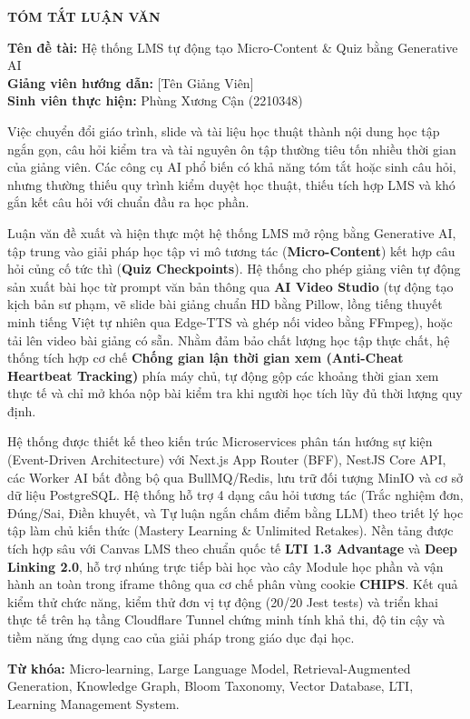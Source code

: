 \thispagestyle{fancy}
\begin{center}
    \textbf{\Large TÓM TẮT LUẬN VĂN}
\end{center}

\vspace{0.5cm}

\noindent\textbf{Tên đề tài:} Hệ thống LMS tự động tạo Micro-Content \& Quiz
bằng Generative AI\\[4pt]
\noindent\textbf{Giảng viên hướng dẫn:} [Tên Giảng Viên]\\[4pt]
\noindent\textbf{Sinh viên thực hiện:} Phùng Xương Cận (2210348)

\vspace{0.7cm}

Việc chuyển đổi giáo trình, slide và tài liệu học thuật thành nội dung học tập
ngắn gọn, câu hỏi kiểm tra và tài nguyên ôn tập thường tiêu tốn nhiều thời
gian của giảng viên. Các công cụ AI phổ biến có khả năng tóm tắt hoặc sinh câu
hỏi, nhưng thường thiếu quy trình kiểm duyệt học thuật, thiếu tích hợp LMS và
khó gắn kết câu hỏi với chuẩn đầu ra học phần.

Luận văn đề xuất và hiện thực một hệ thống LMS mở rộng bằng Generative AI,
tập trung vào giải pháp học tập vi mô tương tác (\textbf{Micro-Content}) kết
hợp câu hỏi củng cố tức thì (\textbf{Quiz Checkpoints}). Hệ thống cho phép
giảng viên tự động sản xuất bài học từ prompt văn bản thông qua \textbf{AI
Video Studio} (tự động tạo kịch bản sư phạm, vẽ slide bài giảng chuẩn HD bằng
Pillow, lồng tiếng thuyết minh tiếng Việt tự nhiên qua Edge-TTS và ghép nối
video bằng FFmpeg), hoặc tải lên video bài giảng có sẵn. Nhằm đảm bảo chất lượng
học tập thực chất, hệ thống tích hợp cơ chế \textbf{Chống gian lận thời gian xem
(Anti-Cheat Heartbeat Tracking)} phía máy chủ, tự động gộp các khoảng thời gian
xem thực tế và chỉ mở khóa nộp bài kiểm tra khi người học tích lũy đủ thời lượng
quy định.

Hệ thống được thiết kế theo kiến trúc Microservices phân tán hướng sự kiện
(Event-Driven Architecture) với Next.js App Router (BFF), NestJS Core API, các
Worker AI bất đồng bộ qua BullMQ/Redis, lưu trữ đối tượng MinIO và cơ sở dữ liệu
PostgreSQL. Hệ thống hỗ trợ 4 dạng câu hỏi tương tác (Trắc nghiệm đơn, Đúng/Sai,
Điền khuyết, và Tự luận ngắn chấm điểm bằng LLM) theo triết lý học tập làm chủ
kiến thức (Mastery Learning & Unlimited Retakes). Nền tảng được tích hợp sâu với
Canvas LMS theo chuẩn quốc tế \textbf{LTI 1.3 Advantage} và \textbf{Deep Linking
2.0}, hỗ trợ nhúng trực tiếp bài học vào cây Module học phần và vận hành an toàn
trong iframe thông qua cơ chế phân vùng cookie \textbf{CHIPS}. Kết quả kiểm thử
chức năng, kiểm thử đơn vị tự động (20/20 Jest tests) và triển khai thực tế trên
hạ tầng Cloudflare Tunnel chứng minh tính khả thi, độ tin cậy và tiềm năng ứng
dụng cao của giải pháp trong giáo dục đại học.

\vspace{0.5cm}

\noindent\textbf{\large Từ khóa:} Micro-learning, Large Language Model,
Retrieval-Augmented Generation, Knowledge Graph, Bloom Taxonomy, Vector
Database, LTI, Learning Management System.
